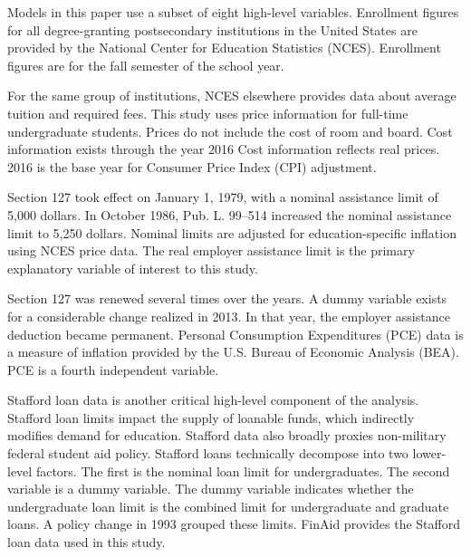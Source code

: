 \documentclass[review]{elsarticle}
\begin{document}
Models in this paper use a subset of eight high-level variables.
Enrollment figures for all degree-granting postsecondary institutions in the United States
are provided by the National Center for Education Statistics (NCES)\cite{nces_2019}.
Enrollment figures are for the fall semester of the school year.

For the same group of institutions,
NCES elsewhere provides data about average tuition and required fees\cite{nces_2017}.
This study uses price information for full-time undergraduate students.
Prices do not include the cost of room and board.
Cost information exists through the year 2016
Cost information reflects real prices.
2016 is the base year for Consumer Price Index (CPI) adjustment.

Section 127 took effect on January 1, 1979, with a nominal assistance limit of 5,000 dollars\cite{plaw95_600_1978}.
In October 1986, Pub. L. 99–514 increased the nominal assistance limit to 5,250 dollars\cite{plaw99_514_1986}.
Nominal limits are adjusted for education-specific inflation using NCES price data.
The real employer assistance limit is the primary explanatory variable of interest to this study.

Section 127 was renewed several times over the years.
A dummy variable exists for a considerable change realized in 2013.
In that year, the employer assistance deduction became permanent.
Personal Consumption Expenditures (PCE) data is a measure of inflation provided by the U.S. Bureau of Economic Analysis (BEA)\cite{bea_2020}.
PCE is a fourth independent variable.

Stafford loan data is another critical high-level component of the analysis.
Stafford loan limits impact the supply of loanable funds, which indirectly modifies demand for education.
Stafford data also broadly proxies non-military federal student aid policy.
Stafford loans technically decompose into two lower-level factors.
The first is the nominal loan limit for undergraduates.
The second variable is a dummy variable.
The dummy variable indicates whether the undergraduate loan limit is the combined limit for undergraduate and graduate loans.
A policy change in 1993 grouped these limits.
FinAid provides the Stafford loan data used in this study\cite{finaid_2020}.
\end{document}
